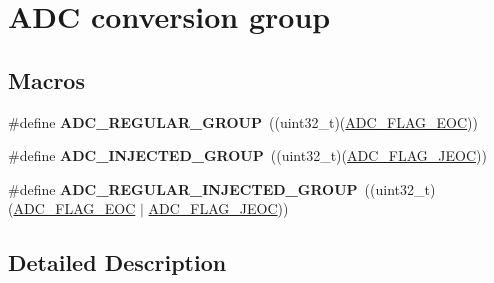 \hypertarget{group___a_d_c__conversion__group}{}\section{A\+DC conversion group}
\label{group___a_d_c__conversion__group}
\subsection*{Macros}
\begin{DoxyCompactItemize}
\item 
\mbox{\label{group___a_d_c__conversion__group_ga5330c69e67bd145bcf413b153e4dbf81}} 
\#define {\bfseries A\+D\+C\+\_\+\+R\+E\+G\+U\+L\+A\+R\+\_\+\+G\+R\+O\+UP}~((uint32\+\_\+t)(\hyperlink{group___a_d_c__flags__definition_gaf2c6fdf7e9ab63b778149e5fb56413d4}{A\+D\+C\+\_\+\+F\+L\+A\+G\+\_\+\+E\+OC}))
\item 
\mbox{\label{group___a_d_c__conversion__group_gaa4bd962bf44dede624f7174fbc2c1dfb}} 
\#define {\bfseries A\+D\+C\+\_\+\+I\+N\+J\+E\+C\+T\+E\+D\+\_\+\+G\+R\+O\+UP}~((uint32\+\_\+t)(\hyperlink{group___a_d_c__flags__definition_ga4df8eea8ab83d98104ee15a339743a4e}{A\+D\+C\+\_\+\+F\+L\+A\+G\+\_\+\+J\+E\+OC}))
\item 
\mbox{\label{group___a_d_c__conversion__group_ga33c9e815701f0495ceb9f46a598dfb78}} 
\#define {\bfseries A\+D\+C\+\_\+\+R\+E\+G\+U\+L\+A\+R\+\_\+\+I\+N\+J\+E\+C\+T\+E\+D\+\_\+\+G\+R\+O\+UP}~((uint32\+\_\+t)(\hyperlink{group___a_d_c__flags__definition_gaf2c6fdf7e9ab63b778149e5fb56413d4}{A\+D\+C\+\_\+\+F\+L\+A\+G\+\_\+\+E\+OC} $\vert$ \hyperlink{group___a_d_c__flags__definition_ga4df8eea8ab83d98104ee15a339743a4e}{A\+D\+C\+\_\+\+F\+L\+A\+G\+\_\+\+J\+E\+OC}))
\end{DoxyCompactItemize}


\subsection{Detailed Description}
